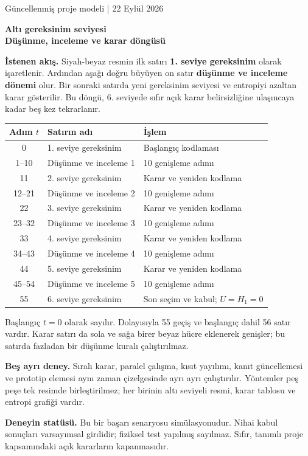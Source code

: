 \documentclass[11pt,a4paper]{article}
\newcommand{\heading}[2]{{\sffamily\small\color{blue!40!black}#1}\par{\sffamily\LARGE\bfseries#2}\par\vspace{3mm}}
\begin{document}
\heading{Güncellenmiş proje modeli | 22 Eylül 2026}{Altı gereksinim seviyesi\\Düşünme, inceleme ve karar döngüsü}
\textbf{İstenen akış.} Siyah-beyaz resmin ilk satırı \textbf{1. seviye
gereksinim} olarak işaretlenir. Ardından aşağı doğru büyüyen on satır
\textbf{düşünme ve inceleme dönemi} olur. Bir sonraki satırda yeni gereksinim
seviyesi ve entropiyi azaltan karar gösterilir. Bu döngü, 6. seviyede sıfır
açık karar belirsizliğine ulaşıncaya kadar beş kez tekrarlanır.

\begin{center}\begin{tabular}{cll}\toprule
Adım $t$ & Satırın adı & İşlem\\\midrule
0 & 1. seviye gereksinim & Başlangıç kodlaması\\
1--10 & Düşünme ve inceleme 1 & 10 genişleme adımı\\
11 & 2. seviye gereksinim & Karar ve yeniden kodlama\\
12--21 & Düşünme ve inceleme 2 & 10 genişleme adımı\\
22 & 3. seviye gereksinim & Karar ve yeniden kodlama\\
23--32 & Düşünme ve inceleme 3 & 10 genişleme adımı\\
33 & 4. seviye gereksinim & Karar ve yeniden kodlama\\
34--43 & Düşünme ve inceleme 4 & 10 genişleme adımı\\
44 & 5. seviye gereksinim & Karar ve yeniden kodlama\\
45--54 & Düşünme ve inceleme 5 & 10 genişleme adımı\\
55 & 6. seviye gereksinim & Son seçim ve kabul; $U=H_1=0$\\\bottomrule
\end{tabular}\end{center}
Başlangıç $t=0$ olarak sayılır. Dolayısıyla 55 geçiş ve başlangıç dahil
56 satır vardır. Karar satırı da sola ve sağa birer beyaz hücre eklenerek
genişler; bu satırda fazladan bir düşünme kuralı çalıştırılmaz.

\textbf{Beş ayrı deney.} Sıralı karar, paralel çalışma, kısıt yayılımı,
kanıt güncellemesi ve prototip elemesi aynı zaman çizelgesinde ayrı ayrı
çalıştırılır. Yöntemler peş peşe tek resimde birleştirilmez; her birinin
altı seviyeli resmi, karar tablosu ve entropi grafiği vardır.

\textbf{Deneyin statüsü.} Bu bir başarı senaryosu simülasyonudur. Nihai
kabul sonuçları varsayımsal girdidir; fiziksel test yapılmış sayılmaz.
Sıfır, tanımlı proje kapsamındaki açık kararların kapanmasıdır.
\end{document}
